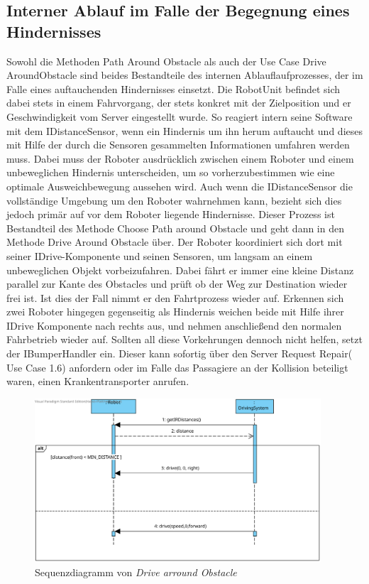 	\subsection*{Interner Ablauf im Falle der Begegnung eines Hindernisses}
	Sowohl die Methoden Path Around Obstacle als auch der Use Case Drive AroundObstacle sind beides Bestandteile des internen Ablauflaufprozesses, der im Falle eines auftauchenden Hindernisses einsetzt. 
	Die RobotUnit befindet sich dabei stets in einem Fahrvorgang, der stets konkret mit der Zielposition und er Geschwindigkeit vom Server eingestellt wurde. 
	So reagiert intern seine Software mit dem IDistanceSensor, wenn ein Hindernis um ihn herum auftaucht und dieses mit Hilfe der durch die Sensoren gesammelten Informationen umfahren werden muss. 
	Dabei muss der Roboter ausdrücklich zwischen einem Roboter und einem unbeweglichen Hindernis unterscheiden, um so vorherzubestimmen wie eine optimale Ausweichbewegung aussehen wird. 
	Auch wenn die IDistanceSensor die vollständige Umgebung um den Roboter wahrnehmen kann, bezieht sich dies jedoch primär auf vor dem Roboter liegende Hindernisse. 
	Dieser Prozess ist Bestandteil des Methode Choose Path around Obstacle und geht dann in den Methode Drive Around Obstacle über. 
	Der Roboter koordiniert sich dort mit seiner IDrive-Komponente und seinen Sensoren, um langsam an einem unbeweglichen Objekt vorbeizufahren. 
	Dabei fährt er immer eine kleine Distanz parallel zur Kante des Obstacles und prüft ob der Weg zur Destination wieder frei ist. 
	Ist dies der Fall nimmt er den Fahrtprozess wieder auf. 
	Erkennen sich zwei Roboter hingegen gegenseitig als Hindernis weichen beide mit Hilfe ihrer IDrive Komponente nach rechts aus, und nehmen anschließend den normalen Fahrbetrieb wieder auf. 
	Sollten all diese Vorkehrungen dennoch nicht helfen, setzt der IBumperHandler ein. 
	Dieser kann sofortig über den Server Request Repair( Use Case 1.6) anfordern oder im Falle das Passagiere an der Kollision beteiligt waren, einen Krankentransporter anrufen.
 \\
	
	\begin{figure}[H]
		\centering
		\includegraphics[width=0.95\textwidth]{img/1-Entwurf-8-DriveArroundObstacle}
		\caption{Sequenzdiagramm von \emph{Drive arround Obstacle}}
		\label{UmfahrenvonstatichenObjekten}
	\end{figure}
	\vspace{1cm}
	
